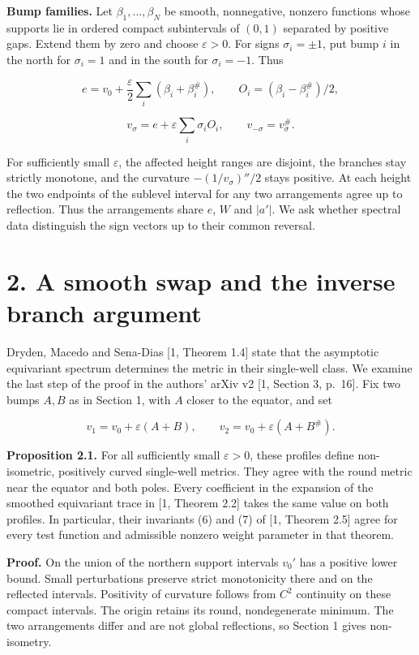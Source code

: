 \documentclass[11pt,letterpaper]{article}
\begin{document}
\textbf{Bump families.} Let \(\beta_1,\ldots,\beta_N\) be smooth, nonnegative, nonzero
functions whose supports lie in ordered compact subintervals of \((0,1)\) separated by
positive gaps. Extend them by zero and choose \(\varepsilon>0\). For signs
\(\sigma_i=\pm1\), put bump \(i\) in the north for \(\sigma_i=1\) and in the south for
\(\sigma_i=-1\). Thus

\[e=v_0+\frac{\varepsilon}{2}\sum_i(\beta_i+\beta_i^\#),\qquad O_i=(\beta_i-\beta_i^\#)/2,\]

\[v_\sigma=e+\varepsilon\sum_i\sigma_i O_i,\qquad v_{-\sigma}=v_\sigma^\#.\]

For sufficiently small \(\varepsilon\), the affected height ranges are disjoint, the
branches stay strictly monotone, and the curvature \(-(1/v_\sigma)''/2\) stays positive. At
each height the two endpoints of the sublevel interval for any two arrangements agree up to
reflection. Thus the arrangements share \(e\), \(W\) and \(|a'|\). We ask whether spectral
data distinguish the sign vectors up to their common reversal.

\section{2. A smooth swap and the inverse branch
argument}\label{a-smooth-swap-and-the-inverse-branch-argument}

Dryden, Macedo and Sena-Dias [1, Theorem 1.4] state that the asymptotic equivariant
spectrum determines the metric in their single-well class. We examine the last step of the
proof in the authors' arXiv v2 [1, Section 3, p.~16]. Fix two bumps \(A,B\) as in
Section 1, with \(A\) closer to the equator, and set

\[v_1=v_0+\varepsilon(A+B),\qquad v_2=v_0+\varepsilon(A+B^\#).\]

\textbf{Proposition 2.1.} For all sufficiently small \(\varepsilon>0\), these profiles
define non-isometric, positively curved single-well metrics. They agree with the round
metric near the equator and both poles. Every coefficient in the expansion of the smoothed
equivariant trace in [1, Theorem 2.2] takes the same value on both profiles. In
particular, their invariants (6) and (7) of [1, Theorem 2.5] agree for every test
function and admissible nonzero weight parameter in that theorem.

\textbf{Proof.} On the union of the northern support intervals \(v_0'\) has a positive lower
bound. Small perturbations preserve strict monotonicity there and on the reflected
intervals. Positivity of curvature follows from \(C^2\) continuity on these compact
intervals. The origin retains its round, nondegenerate minimum. The two arrangements differ
and are not global reflections, so Section 1 gives non-isometry.
\end{document}
